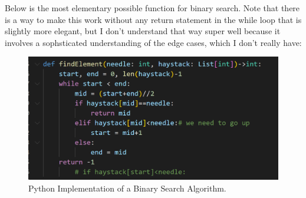 \documentclass[12pt]{article}
\begin{document}
Below is the most elementary possible function for binary search. Note that there is a way to make this work without any return statement in the while loop that is slightly more elegant, but I don't understand that way super well because it involves a sophsticated understanding of the edge cases, which I don't really have:
\begin{figure}[H]
    \centering
    \includegraphics[width=1.0\textwidth]{./needleHaystack.png} %
	\caption{Python Implementation of a Binary Search Algorithm.}
\end{figure}
\end{document}
